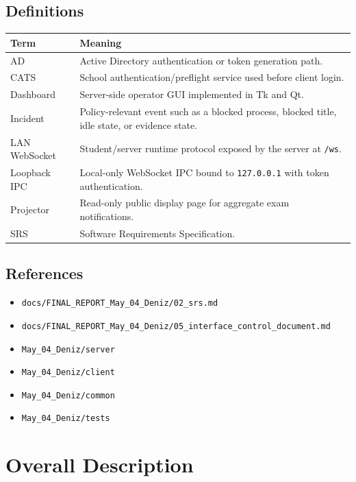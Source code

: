 \documentclass[12pt,a4paper]{article}
\begin{document}
\subsection{Definitions}

\begin{longtable}{L{0.22\textwidth} L{0.68\textwidth}}
\textbf{Term} & \textbf{Meaning} \\
\hline
AD & Active Directory authentication or token generation path. \\
CATS & School authentication/preflight service used before client login. \\
Dashboard & Server-side operator GUI implemented in Tk and Qt. \\
Incident & Policy-relevant event such as a blocked process, blocked title, idle state, or evidence state. \\
LAN WebSocket & Student/server runtime protocol exposed by the server at \texttt{/ws}. \\
Loopback IPC & Local-only WebSocket IPC bound to \texttt{127.0.0.1} with token authentication. \\
Projector & Read-only public display page for aggregate exam notifications. \\
SRS & Software Requirements Specification. \\
\end{longtable}

\subsection{References}

\begin{itemize}
    \item \texttt{docs/FINAL\_REPORT\_May\_04\_Deniz/02\_srs.md}
    \item \texttt{docs/FINAL\_REPORT\_May\_04\_Deniz/05\_interface\_control\_document.md}
    \item \texttt{May\_04\_Deniz/server}
    \item \texttt{May\_04\_Deniz/client}
    \item \texttt{May\_04\_Deniz/common}
    \item \texttt{May\_04\_Deniz/tests}
\end{itemize}

\section{Overall Description}
\end{document}
